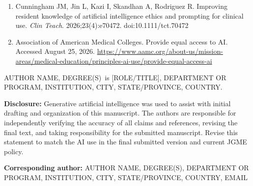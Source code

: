 \documentclass[12pt]{article}
\newcommand{\AuthorName}{AUTHOR NAME, DEGREE(S)}
\newcommand{\AuthorAffiliation}{DEPARTMENT OR PROGRAM, INSTITUTION, CITY, STATE/PROVINCE, COUNTRY}
\newcommand{\CorrespondingEmail}{EMAIL}
\begin{document}
\begin{enumerate}
  \item Cunningham JM, Jin L, Kazi I, Skandhan A, Rodriguez R. Improving
        resident knowledge of artificial intelligence ethics and prompting for
        clinical use. \textit{Clin Teach}. 2026;23(4):e70472.
        doi:10.1111/tct.70472

  \item Association of American Medical Colleges. Provide equal access to AI.
        Accessed August 25, 2026.
        \url{https://www.aamc.org/about-us/mission-areas/medical-education/principles-ai-use/provide-equal-access-ai}
\end{enumerate}

\vspace{1em}

\noindent
\AuthorName\ is [ROLE/TITLE], \AuthorAffiliation.

\vspace{0.5em}

\noindent
\textbf{Disclosure:} Generative artificial intelligence was used to assist
with initial drafting and organization of this manuscript. The authors are
responsible for independently verifying the accuracy of all claims and
references, revising the final text, and taking responsibility for the
submitted manuscript. Revise this statement to match the AI use in the final
submitted version and current JGME policy.

\vspace{0.5em}

\noindent
\textbf{Corresponding author:}
\AuthorName, \AuthorAffiliation, \CorrespondingEmail
\end{document}
